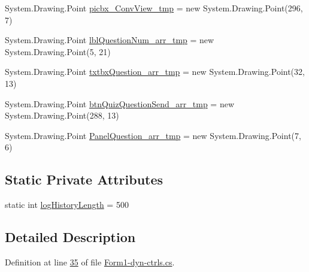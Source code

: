 \begin{DoxyCompactItemize}
\item 
\-System.\-Drawing.\-Point \hyperlink{class_sr_p___classroom_inq_1_1frm_classrrom_inq_ae49fd425a3c4f52d94af6c20b67f6126}{picbx\-\_\-\-Conv\-View\-\_\-tmp} = new \-System.\-Drawing.\-Point(296, 7)
\item 
\-System.\-Drawing.\-Point \hyperlink{class_sr_p___classroom_inq_1_1frm_classrrom_inq_a9af0d3cc5171be1c8b01ea1e208d61ee}{lbl\-Question\-Num\-\_\-arr\-\_\-tmp} = new \-System.\-Drawing.\-Point(5, 21)
\item 
\-System.\-Drawing.\-Point \hyperlink{class_sr_p___classroom_inq_1_1frm_classrrom_inq_a09f25b6934ed463e8b781498b5511796}{txtbx\-Question\-\_\-arr\-\_\-tmp} = new \-System.\-Drawing.\-Point(32, 13)
\item 
\-System.\-Drawing.\-Point \hyperlink{class_sr_p___classroom_inq_1_1frm_classrrom_inq_a8dcbe5ae5d44d445994571c17345e756}{btn\-Quiz\-Question\-Send\-\_\-arr\-\_\-tmp} = new \-System.\-Drawing.\-Point(288, 13)
\item 
\-System.\-Drawing.\-Point \hyperlink{class_sr_p___classroom_inq_1_1frm_classrrom_inq_a3e546b9b0c603a788d0316efe572c960}{\-Panel\-Question\-\_\-arr\-\_\-tmp} = new \-System.\-Drawing.\-Point(7, 6)
\end{DoxyCompactItemize}
\subsection*{\-Static \-Private \-Attributes}
\begin{DoxyCompactItemize}
\item 
static int \hyperlink{class_sr_p___classroom_inq_1_1frm_classrrom_inq_a0b55eb955abb243808249457ac92ca93}{log\-History\-Length} = 500
\end{DoxyCompactItemize}


\subsection{\-Detailed \-Description}


\-Definition at line \hyperlink{_form1-dyn-ctrls_8cs_source_l00035}{35} of file \hyperlink{_form1-dyn-ctrls_8cs_source}{\-Form1-\/dyn-\/ctrls.\-cs}.



